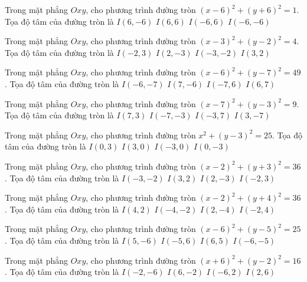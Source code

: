 \begin{ex}
Trong mặt phẳng $Oxy$, cho phương trình đường tròn $(x -6)^2   + (y + 6)^2 = 1$. Tọa độ tâm của đường tròn là
\choice
{ \True $I(6, -6)$ }
{ $I(6, 6)$ }
{ $I(-6, 6)$ }
{ $I(-6, -6)$ }
\end{ex}

\begin{ex}
Trong mặt phẳng $Oxy$, cho phương trình đường tròn $(x -3)^2   + (y -2)^2 = 4$. Tọa độ tâm của đường tròn là
\choice
{ $I(-2, 3)$ }
{ $I(2, -3)$ }
{ $I(-3, -2)$ }
{ \True $I(3, 2)$ }
\end{ex}

\begin{ex}
Trong mặt phẳng $Oxy$, cho phương trình đường tròn $(x -6)^2   + (y -7)^2 = 49$. Tọa độ tâm của đường tròn là
\choice
{ $I(-6, -7)$ }
{ $I(7, -6)$ }
{ $I(-7, 6)$ }
{ \True $I(6, 7)$ }
\end{ex}

\begin{ex}
Trong mặt phẳng $Oxy$, cho phương trình đường tròn $(x -7)^2   + (y -3)^2 = 9$. Tọa độ tâm của đường tròn là
\choice
{ \True $I(7, 3)$ }
{ $I(-7, -3)$ }
{ $I(-3, 7)$ }
{ $I(3, -7)$ }
\end{ex}

\begin{ex}
Trong mặt phẳng $Oxy$, cho phương trình đường tròn $x^2 + (y -3)^2 = 25$. Tọa độ tâm của đường tròn là
\choice
{ \True $I(0, 3)$ }
{ $I(3, 0)$ }
{ $I(-3, 0)$ }
{ $I(0, -3)$ }
\end{ex}

\begin{ex}
Trong mặt phẳng $Oxy$, cho phương trình đường tròn $(x -2)^2   + (y + 3)^2 = 36$. Tọa độ tâm của đường tròn là
\choice
{ $I(-3, -2)$ }
{ $I(3, 2)$ }
{ \True $I(2, -3)$ }
{ $I(-2, 3)$ }
\end{ex}

\begin{ex}
Trong mặt phẳng $Oxy$, cho phương trình đường tròn $(x -2)^2   + (y + 4)^2 = 36$. Tọa độ tâm của đường tròn là
\choice
{ $I(4, 2)$ }
{ $I(-4, -2)$ }
{ \True $I(2, -4)$ }
{ $I(-2, 4)$ }
\end{ex}

\begin{ex}
Trong mặt phẳng $Oxy$, cho phương trình đường tròn $(x -6)^2   + (y -5)^2 = 25$. Tọa độ tâm của đường tròn là
\choice
{ $I(5, -6)$ }
{ $I(-5, 6)$ }
{ \True $I(6, 5)$ }
{ $I(-6, -5)$ }
\end{ex}

\begin{ex}
Trong mặt phẳng $Oxy$, cho phương trình đường tròn $(x + 6)^2  + (y -2)^2 = 16$. Tọa độ tâm của đường tròn là
\choice
{ $I(-2, -6)$ }
{ $I(6, -2)$ }
{ \True $I(-6, 2)$ }
{ $I(2, 6)$ }
\end{ex}

